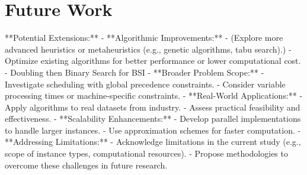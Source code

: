 \chapter{Future Work}

\begin{markdown}
    **Potential Extensions:**
    - **Algorithmic Improvements:**
    - (Explore more advanced heuristics or metaheuristics (e.g., genetic algorithms, tabu
    search).)
    - Optimize existing algorithms for better performance or lower computational cost.
    - Doubling then Binary Search for BSI
    - **Broader Problem Scope:**
    - Investigate scheduling with global precedence constraints.
    - Consider variable processing times or machine-specific constraints.
    - **Real-World Applications:**
    - Apply algorithms to real datasets from industry.
    - Assess practical feasibility and effectiveness.
    - **Scalability Enhancements:**
    - Develop parallel implementations to handle larger instances.
    - Use approximation schemes for faster computation.
    - **Addressing Limitations:**
    - Acknowledge limitations in the current study (e.g., scope of instance types, computational
    resources).
    - Propose methodologies to overcome these challenges in future research.
\end{markdown}